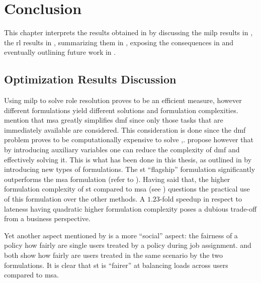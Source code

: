 \chapter{Conclusion}
\label{ch:conclusion}

This chapter interprets the results obtained in  by discussing the \gls{milp} results in , the \gls{rl} results in , summarizing them in , exposing the consequences in  and eventually outlining future work in .

\section{Optimization Results Discussion}
\label{sec:optimization_discussion}

Using \gls{milp} to solve role resolution proves to be an efficient measure, however different formulations yield different solutions and formulation complexities. \citet[p. 15]{Zeng2005} mention that \gls{msa} greatly simplifies \gls{dmf} since only those tasks that are immediately available are considered. This consideration is done since the \gls{dmf} problem proves to be computationally expensive to solve \citep[p. 13]{Zeng2005},\citep{Garey1990}. \citet[p. 13]{Zeng2005} propose however that by introducing auxiliary variables one can reduce the complexity of \gls{dmf} and effectively solving it. This is what has been done in this thesis, as outlined in  by introducing new types of formulations. The \gls{st} ``flagship'' formulation significantly outperforms the \gls{msa} formulation (refer to ). Having said that, the higher formulation complexity of \gls{st} compared to \gls{msa} (see ) questions the practical use of this formulation over the other methods. A $1.23$-fold speedup in respect to lateness having quadratic higher formulation complexity poses a dubious trade-off from a business perspective.


Yet another aspect mentioned by \citet[pp. 17--18]{Zeng2005} is a more ``social'' aspect: the fairness of a policy \ie how fairly are single users treated by a policy during job assignment.  and  both show how fairly are users treated in the same scenario by the two formulations. It is clear that \gls{st} is ``fairer'' at balancing loads across users compared to \gls{msa}.

